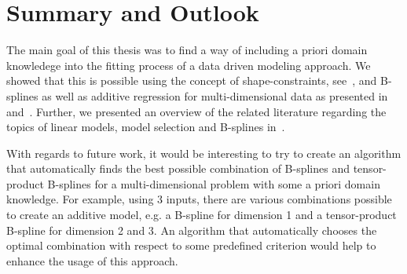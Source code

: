 \chapter{Summary and Outlook} \label{cha:summary}

The main goal of this thesis was to find a way of including a priori domain knowledege into the fitting process of a data driven modeling approach. We showed that this is possible using the concept of shape-constraints, see~, and B-splines as well as additive regression for multi-dimensional data as presented in~ and~. Further, we presented an overview of the related literature regarding the topics of linear models, model selection and B-splines in~. 

With regards to future work, it would be interesting to try to create an algorithm that automatically finds the best possible combination of B-splines and tensor-product B-splines for a multi-dimensional problem with some a priori domain knowledge. For example, using 3 inputs, there are various combinations possible to create an additive model, e.g. a B-spline for dimension 1 and a tensor-product B-spline for dimension 2 and 3. An algorithm that automatically chooses the optimal combination with respect to some predefined criterion would help to enhance the usage of this approach.   